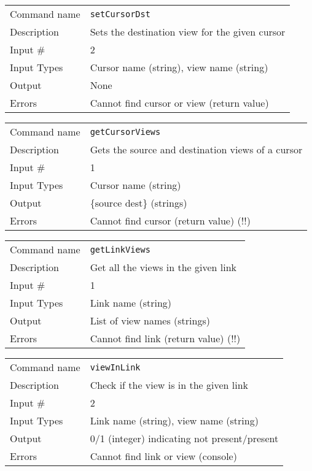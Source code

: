 \bigskip

\noindent
\begin{tabular}{l|p{5in}}
\hline
Command name & {\tt setCursorDst} \\
Description  & Sets the destination view for the given cursor \\
Input \#     & 2 \\
Input Types  & Cursor name (string), view name (string) \\
Output       & None \\
Errors       & Cannot find cursor or view (return value) \\
\hline
\end{tabular}

\bigskip

\noindent
\begin{tabular}{l|p{5in}}
\hline
Command name & {\tt getCursorViews} \\
Description  & Gets the source and destination views of a cursor \\
Input \#     & 1 \\
Input Types  & Cursor name (string) \\
Output       & \{source dest\} (strings) \\
Errors       & Cannot find cursor (return value) (!!) \\
\hline
\end{tabular}

\bigskip

\noindent
\begin{tabular}{l|p{5in}}
\hline
Command name & {\tt getLinkViews} \\
Description  & Get all the views in the given link \\
Input \#     & 1 \\
Input Types  & Link name (string) \\
Output       & List of view names (strings) \\
Errors       & Cannot find link (return value) (!!) \\
\hline
\end{tabular}

\bigskip

\noindent
\begin{tabular}{l|p{5in}}
\hline
Command name & {\tt viewInLink} \\
Description  & Check if the view is in the given link \\
Input \#     & 2 \\
Input Types  & Link name (string), view name (string) \\
Output       & 0/1 (integer) indicating not present/present \\
Errors       & Cannot find link or view (console) \\
\hline
\end{tabular}

